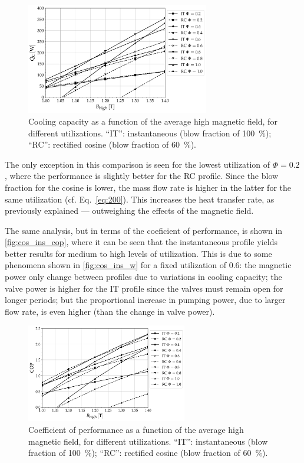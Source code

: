 \documentclass[referee]{svjour3}
\begin{document}
\begin{figure}[!ht]
  \centering
\includegraphics[width=8cm]{Qc_B_comp_f_1_same_minimum}
  \caption{Cooling capacity as a function of the  average high magnetic field, for different utilizations. \textcolor{black}{``IT''}: instantaneous (blow fraction of \SI{100}{\percent}); ``RC'': rectified cosine  (blow fraction of \SI{60}{\percent}).}
 \label{fig:cos_ins}
\end{figure}

The only exception in this comparison  is seen for the lowest utilization of $\Phi = 0.2$, where the performance is slightly better for the RC profile. Since the blow fraction for the cosine is lower, the mass flow rate \textcolor{black}{is} higher \textcolor{black}{in the latter for} the same utilization (cf. Eq.~\eqref{eq:200}). \textcolor{black}{This} increases \textcolor{black}{the} heat transfer rate, as previously explained ---  outweighing the effects of the magnetic field.


The same analysis, but in terms of the coeficient of performance, is shown in \autoref{fig:cos_ins_cop}, where it can be seen that the instantaneous profile yields better results for medium to high levels of utilization. This is due to some phenomena shown in \autoref{fig:cos_ins_w} for a fixed utilization of 0.6: the magnetic power only change between profiles due to variations in cooling capacity; the valve power is higher for the IT profile since the valves must remain open for longer periods; but the proportional increase in pumping power, due to larger flow rate, is even higher (than the change in valve power).

\begin{figure}[!ht]
  \centering
\includegraphics[width=7cm]{COP_B_comp_f_1_same_minimum}
  \caption{Coefficient of performance as a function of the  average high magnetic field, for different utilizations. \textcolor{black}{``IT''}: instantaneous (blow fraction of \SI{100}{\percent}); ``RC'': rectified cosine  (blow fraction of \SI{60}{\percent}).}
 \label{fig:cos_ins_cop}
\end{figure}
\end{document}
